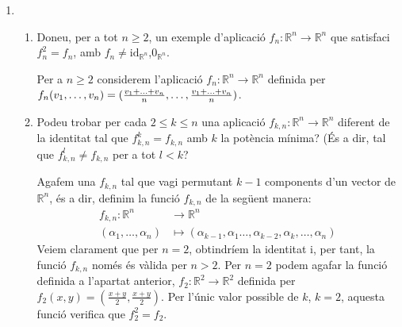 \documentclass[11pt,a4paper]{article}
\begin{document}
\begin{enumerate}
    \item 
    \begin{enumerate}
        \item Doneu, per a tot $n\geq 2$, un exemple d'aplicació $f_n:\mathbb{R}^n\longrightarrow \mathbb{R}^n$  que satisfaci $f_n^2=f_n$, amb $f_n\ne \text{id}_{\mathbb{R}^n}$,$0_{\mathbb{R}^n}$.\par
        Per a $n\geq 2$ considerem l'aplicació $f_n:\mathbb{R}^n\longrightarrow \mathbb{R}^n$ definida per $f_n(v_1,\ldots,v_n)=(\frac{v_1+\ldots+v_n}{n},\ldots,\\\frac{v_1+\ldots+v_n}{n})$.
        \item Podeu trobar per cada $2\leq k\leq n$ una aplicació $f_{k,n}:\mathbb{R}^n\longrightarrow \mathbb{R}^n$ diferent de la identitat tal que $f_{k,n}^k=f_{k,n}$ amb $k$ la potència mínima? (És a dir, tal que $f_{k,n}^l\ne f_{k,n}$ per a tot $l<k$?\par
        Agafem una $f_{k,n}$ tal que vagi permutant $k-1$ components d'un vector de $\mathbb{R}^n$, és a dir, definim la funció $f_{k,n}$ de la següent manera:
        \begin{align*}
            f_{k,n}:\mathbb{R}^n&\longrightarrow\mathbb{R}^n\\
            (\alpha_1,\ldots,\alpha_n)&\longmapsto(\alpha_{k-1},\alpha_1\ldots,\alpha_{k-2},\alpha_k,\ldots,\alpha_n)
        \end{align*}
        Veiem clarament que per $n=2$, obtindríem la identitat i, per tant, la funció $f_{k,n}$ només és vàlida per $n>2$. Per $n=2$ podem agafar la funció definida a l'apartat anterior, $f_2:\mathbb{R}^2\longrightarrow\mathbb{R}^2$ definida per $f_2(x,y)=(\frac{x+y}{2},\frac{x+y}{2})$. Per l'únic valor possible de $k$, $k=2$, aquesta funció verifica que $f_2^2=f_2$.
        \end{enumerate}
\end{enumerate}
\end{document}
